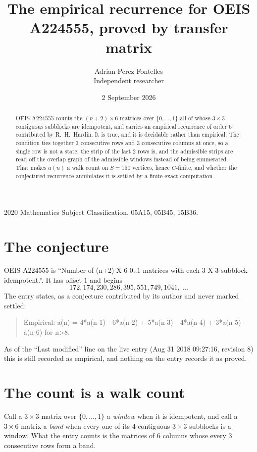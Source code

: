 \documentclass[11pt,a4paper]{article}
\title{The empirical recurrence for OEIS A224555, proved by transfer matrix}
\author{Adrian Perez Fontelles\\ \small Independent researcher}
\date{2 September 2026}
\theoremstyle{plain}
\theoremstyle{definition}
\begin{document}
\maketitle

\begin{abstract}
OEIS A224555 counts the $(n+2)\times6$ matrices over $\{0,\dots,1\}$ all of whose
$3\times3$ contiguous subblocks are idempotent, and carries an empirical recurrence of order
$6$ contributed by R.~H.~Hardin. It is true, and it is decidable rather than empirical.
The condition ties together $3$ consecutive rows and $3$ consecutive columns at once, so a
single row is not a state; the strip of the last $2$ rows is, and the admissible strips
are read off the overlap graph of the admissible windows instead of being enumerated. That
makes $a(n)$ a walk count on $S=150$ vertices, hence $C$-finite, and whether the conjectured
recurrence annihilates it is settled by a finite exact computation.
\end{abstract}

\noindent\small 2020 Mathematics Subject Classification. 05A15, 05B45, 15B36.\normalsize

\section{The conjecture}

OEIS A224555 is ``Number of (n+2) X 6 0..1 matrices with each 3 X 3 subblock idempotent.''. It has offset $1$ and begins
\[
172, 174, 230, 286, 395, 551, 749, 1041,\ \dots
\]
The entry states, as a conjecture contributed by its author and never marked settled:
\begin{quote}
Empirical: a(n) = 4*a(n-1) - 6*a(n-2) + 5*a(n-3) - 4*a(n-4) + 3*a(n-5) - a(n-6) for n>8.
\end{quote}
As of the ``Last modified'' line on the live entry (Aug 31 2018 09:27:16, revision 8) this is still
recorded as empirical, and nothing on the entry records it as proved.

\section{The count is a walk count}

Call a $3\times3$ matrix over $\{0,\dots,1\}$ a \emph{window} when it is idempotent, and
call a $3\times6$ matrix a \emph{band} when every one of its $4$ contiguous
$3\times3$ subblocks is a window. What the entry counts is the matrices of $6$ columns
whose every $3$ consecutive rows form a band.
\end{document}
